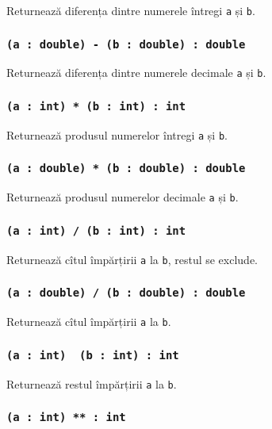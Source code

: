Returnează diferența dintre numerele întregi \texttt{a} și \texttt{b}.

\subsubsection{\texttt{(a : double) - (b : double) : double}}

Returnează diferența dintre numerele decimale \texttt{a} și \texttt{b}.

\subsubsection{\texttt{(a : int) * (b : int) : int}}

Returnează produsul numerelor întregi \texttt{a} și \texttt{b}.

\subsubsection{\texttt{(a : double) * (b : double) : double}}

Returnează produsul numerelor decimale \texttt{a} și \texttt{b}.

\subsubsection{\texttt{(a : int) / (b : int) : int}}

Returnează cîtul împărțirii \texttt{a} la \texttt{b}, restul se exclude.

\subsubsection{\texttt{(a : double) / (b : double) : double}}

Returnează cîtul împărțirii \texttt{a} la \texttt{b}.

\subsubsection{\texttt{(a : int) \ (b : int) : int}}

Returnează restul împărțirii \texttt{a} la \texttt{b}.


\subsubsection{\texttt{(a : int) ** : int}}

